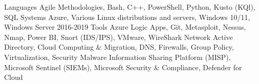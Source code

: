 \begin{cvskills}
  \cvskill
    {Languages} %
     {Agile Methodologies, Bash, C++, PowerShell, Python, Kusto (KQl), SQL}
  \cvskill
    {Systems} %
    {Azure, Various Linux distributions and servers, Windows 10/11, Windows Server 2016-2019}
  \cvskill
     {Tools}
     {Azure Logic Apps, Git, Metasploit, Nessus, Nmap, Power BI, Snort (IDS/IPS), VMware, WireShark}
  \cvskill
     {Network}
     {Active Directory, Cloud Computing \& Migration, DNS, Firewalls, Group Policy, Virtualization,}
  \cvskill
     {Security}
     {Malware Information Sharing Platform (MISP), Microsoft Sentinel (SIEMs), Microsoft Security \& Compliance, Defender for Cloud}
\end{cvskills}
